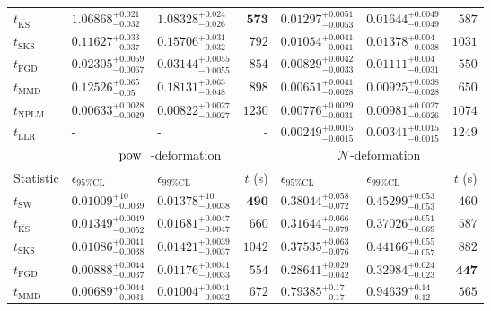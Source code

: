 \begin{tabular}{l|llr|llr}
	$t_{\overline{\mathrm{KS}}}$ & $1.06868_{-0.032}^{+0.021}$ & $1.08328_{-0.026}^{+0.024}$ & ${\mathbf{573}}$ & $0.01297_{-0.0053}^{+0.0051}$ & $0.01644_{-0.0049}^{+0.0049}$ & $587$ \\
	$t_{\mathrm{SKS}}$ & $0.11627_{-0.037}^{+0.033}$ & $0.15706_{-0.032}^{+0.031}$ & $792$ & $0.01054_{-0.0041}^{+0.0041}$ & $0.01378_{-0.0038}^{+0.004}$ & $1031$ \\
	$t_{\mathrm{FGD}}$ & ${\mathbf{0.02305_{-0.0067}^{+0.0059}}}$ & ${\mathbf{0.03144_{-0.0055}^{+0.0055}}}$ & $854$ & $0.00829_{-0.0033}^{+0.0042}$ & $0.01111_{-0.0031}^{+0.004}$ & $550$ \\
	$t_{\mathrm{MMD}}$ & $0.12526_{-0.05}^{+0.065}$ & $0.18131_{-0.048}^{+0.063}$ & $898$ & ${\mathbf{0.00651_{-0.0028}^{+0.0041}}}$ & ${\mathbf{0.00925_{-0.0028}^{+0.0038}}}$ & $650$ \\
\rowcolor{red!35}	$t_{\mathrm{NPLM}}$ & $0.00633_{-0.0029}^{+0.0028}$ & $0.00822_{-0.0027}^{+0.0027}$ & $1230$ & $0.00776_{-0.0031}^{+0.0029}$ & $0.00981_{-0.0026}^{+0.0027}$ & $1074$ \\
	$t_{\mathrm{LLR}}$ & - & - & - & $0.00249_{-0.0015}^{+0.0015}$ & $0.00341_{-0.0015}^{+0.0015}$ & $1249$ \\
	\toprule
	\multicolumn{1}{c}{} & \multicolumn{3}{c}{$\rm{pow}_{-}$-deformation} & \multicolumn{3}{c}{$\mathcal{N}$-deformation} \\
	Statistic & $\epsilon_{95\%\mathrm{CL}}$ & $\epsilon_{99\%\mathrm{CL}}$ & $t$ (s) & $\epsilon_{95\%\mathrm{CL}}$ & $\epsilon_{99\%\mathrm{CL}}$ & $t$ (s) \\
	\midrule
	$t_{\mathrm{SW}}$ & $0.01009_{-0.0039}^{+10}$ & $0.01378_{-0.0038}^{+10}$ & ${\mathbf{490}}$ & $0.38044_{-0.072}^{+0.058}$ & $0.45299_{-0.053}^{+0.053}$ & $460$ \\
	$t_{\overline{\mathrm{KS}}}$ & $0.01349_{-0.0052}^{+0.0049}$ & $0.01681_{-0.0047}^{+0.0047}$ & $660$ & $0.31644_{-0.079}^{+0.066}$ & $0.37026_{-0.069}^{+0.051}$ & $587$ \\
	$t_{\mathrm{SKS}}$ & $0.01086_{-0.0038}^{+0.0041}$ & $0.01421_{-0.0037}^{+0.0039}$ & $1042$ & $0.37535_{-0.076}^{+0.063}$ & $0.44166_{-0.057}^{+0.055}$ & $882$ \\
	$t_{\mathrm{FGD}}$ & $0.00888_{-0.0037}^{+0.0044}$ & $0.01176_{-0.0033}^{+0.0041}$ & $554$ & ${\mathbf{0.28641_{-0.042}^{+0.029}}}$ & ${\mathbf{0.32984_{-0.023}^{+0.024}}}$ & ${\mathbf{447}}$ \\
	$t_{\mathrm{MMD}}$ & ${\mathbf{0.00689_{-0.0031}^{+0.0044}}}$ & ${\mathbf{0.01004_{-0.0032}^{+0.0041}}}$ & $672$ & $0.79385_{-0.17}^{+0.17}$ & $0.94639_{-0.12}^{+0.14}$ & $565$ \\

\end{tabular}
